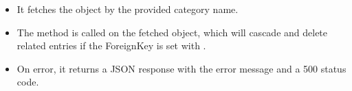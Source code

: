\documentclass[letterpaper,10pt,english]{sphinxmanual}
\begin{document}
\begin{fulllineitems}
\begin{description}
\begin{itemize}
\item {} 
\sphinxAtStartPar
It fetches the  object by the provided category name.

\item {} 
\sphinxAtStartPar
The  method is called on the fetched object, which will cascade and 
delete related entries if the ForeignKey is set with .

\item {} 
\sphinxAtStartPar
On error, it returns a JSON response with the error message and a 500 status code.

\end{itemize}

\end{description}

\end{fulllineitems}

\end{document}
